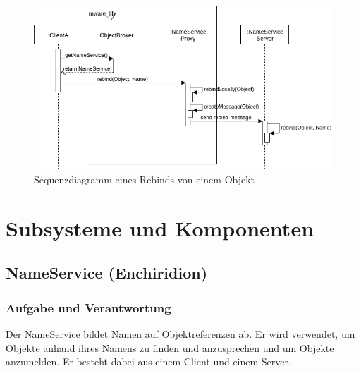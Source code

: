 \documentclass{article}
\begin{document}
\begin{figure}[H]
    \centering
    \includegraphics[width=\textwidth]{rebind-seq.png}
    \caption[rebind-seq-diagram]{Sequenzdiagramm eines Rebinds von einem Objekt}
    \label{fig:full-seq-diagram}
\end{figure}

\newpage

\section{Subsysteme und Komponenten}

\subsection{NameService (Enchiridion)}
\subsubsection{Aufgabe und Verantwortung}
Der NameService bildet Namen auf Objektreferenzen ab. Er wird verwendet, um Objekte anhand
ihres Namens zu finden und anzusprechen und um Objekte anzumelden. Er besteht dabei aus einem Client und einem Server.
\end{document}
